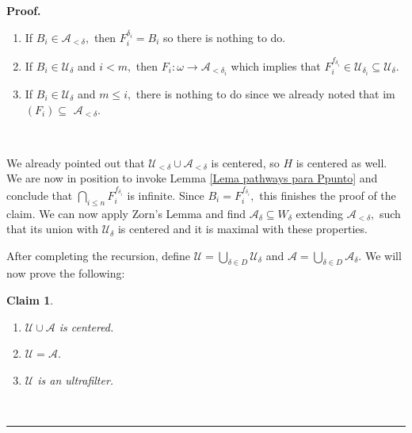 \documentclass{article}%
\newtheorem{claim}[theorem]{Claim}
\newenvironment{proof}[1][Proof]{\noindent\textbf{#1.} }{\ \rule{0.5em}{0.5em}}
\begin{document}
\begin{proof}
\begin{enumerate}
\item If $B_{i}\in\mathcal{A}_{<\delta},$ then $F_{i}^{\delta_{i}}=B_{i}$ so
there is nothing to do.

\item If $B_{i}\in\mathcal{U}_{\delta}$ and $i<m,$ then $F_{i}:\omega
\longrightarrow\mathcal{A}_{<\delta_{i}}$ which implies that $F_{i}%
^{f_{\delta_{i}}}\in\mathcal{U}_{\delta_{i}}\subseteq\mathcal{U}_{\delta}.$

\item If $B_{i}\in\mathcal{U}_{\delta}$ and $m\leq i,$ there is nothing to do
since we already noted that \textsf{im}$\left(  F_{i}\right)  \subseteq$
$\mathcal{A}_{<\delta}.$
\end{enumerate}

\qquad\ \ \ \qquad\ \ 

We already pointed out that $\mathcal{U}_{<\delta}\cup\mathcal{A}_{<\delta}$
is centered, so $H$ is centered as well. We are now in position to invoke
Lemma \ref{Lema pathways para Ppunto} and conclude that $%
{\textstyle\bigcap\limits_{i\leq n}}
F_{i}^{f_{\delta_{i}}}$ is infinite. Since $B_{i}=F_{i}^{f_{\delta_{i}}},$
this finishes the proof of the claim. We can now apply Zorn's Lemma and find
$\mathcal{A}_{\delta}\subseteq W_{\delta}$ extending $\mathcal{A}_{<\delta},$
such that its union with $\mathcal{U}_{\delta}$ is centered and it is maximal
with these properties.

\qquad\qquad\qquad

After completing the recursion, define $\mathcal{U=}%
{\textstyle\bigcup\limits_{\delta\in D}}
\mathcal{U}_{\delta}$ and $\mathcal{A=}%
{\textstyle\bigcup\limits_{\delta\in D}}
\mathcal{A}_{\delta}.$ We will now prove the following:

\begin{claim}
\qquad\ \ \ 

\begin{enumerate}
\item $\mathcal{U\cup A}$ is centered.

\item $\mathcal{U}=\mathcal{A}.$

\item $\mathcal{U}$ is an ultrafilter.


\end{enumerate}
\end{claim}
\end{proof}
\end{document}

